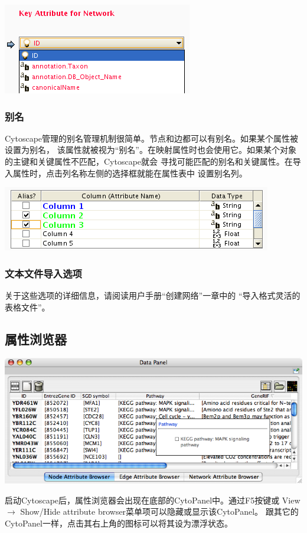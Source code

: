 \includegraphics[width=.3\textwidth]{images/attribute_table_import_keyattr.png} 
 
\subsubsection{别名}
Cytoscape管理的别名管理机制很简单。节点和边都可以有别名。如果某个属性被设置为别名，
该属性就被视为``别名''。在映射属性时也会使用它。如果某个对象的主键和关键属性不匹配，Cytoscape就会
寻找可能匹配的别名和关键属性。在导入属性时，点击列名称左侧的选择框就能在属性表中
设置别名列。

\includegraphics[width=.3\textwidth]{images/attribute_table_import_alias.png} 
 
\subsubsection{文本文件导入选项}
关于这些选项的详细信息，请阅读用户手册``创建网络''一章中的
``导入格式灵活的表格文件''。 

\subsection{属性浏览器}
\includegraphics[width=.5\textwidth]{images/attribute_browser26.png} 
 
启动Cytoscape后，属性浏览器会出现在底部的CytoPanel中。通过F5按键或 View 
$\rightarrow$ Show/Hide attribute browser菜单项可以隐藏或显示该CytoPanel。 
跟其它的CytoPanel一样，点击其右上角的图标可以将其设为漂浮状态。

